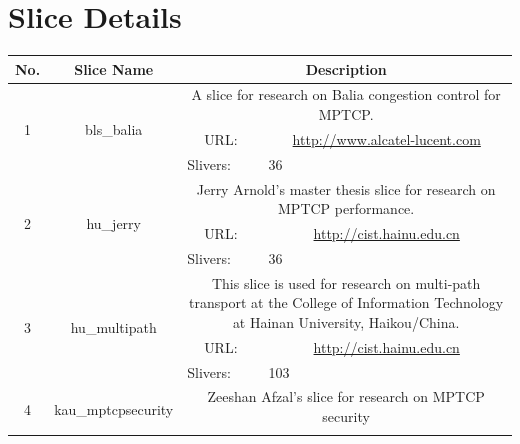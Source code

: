 \chapter{Slice Details}
\label{cha:Slice-Details}


\begin{small}
\begin{center}
\begin{longtable}{|c|c|c|c|}
 \hline
 No. & Slice Name & \multicolumn{2}{|p{20em}|}{Description} \\ \hline
 \multirow{3}{*}{1} & \multirow{3}{*}{\index{bls\_balia}\index{Slice!bls\_balia}bls\_balia} & \multicolumn{2}{|p{30em}|}{A slice for research on Balia congestion control for MPTCP.} \\* \cline{3-3}\cline{4-4}
  &  & \multicolumn{1}{|p{5em}|}{URL:} & \multicolumn{1}{|p{22.5em}|}{\url{http://www.alcatel-lucent.com}} \\* \cline{3-3}\cline{4-4}
  &  & \multicolumn{1}{|l|}{Slivers:} & \multicolumn{1}{|l|}{36} \\ \hline
 \multirow{3}{*}{2} & \multirow{3}{*}{\index{hu\_jerry}\index{Slice!hu\_jerry}hu\_jerry} & \multicolumn{2}{|p{30em}|}{Jerry Arnold's master thesis slice for research on MPTCP performance.} \\* \cline{3-3}\cline{4-4}
  &  & \multicolumn{1}{|p{5em}|}{URL:} & \multicolumn{1}{|p{22.5em}|}{\url{http://cist.hainu.edu.cn}} \\* \cline{3-3}\cline{4-4}
  &  & \multicolumn{1}{|l|}{Slivers:} & \multicolumn{1}{|l|}{36} \\ \hline
 \multirow{3}{*}{3} & \multirow{3}{*}{\index{hu\_multipath}\index{Slice!hu\_multipath}hu\_multipath} & \multicolumn{2}{|p{30em}|}{This slice is used for research on multi-path transport at the College of Information Technology at Hainan University, Haikou/China.} \\* \cline{3-3}\cline{4-4}
  &  & \multicolumn{1}{|p{5em}|}{URL:} & \multicolumn{1}{|p{22.5em}|}{\url{http://cist.hainu.edu.cn}} \\* \cline{3-3}\cline{4-4}
  &  & \multicolumn{1}{|l|}{Slivers:} & \multicolumn{1}{|l|}{103} \\ \hline
 \multirow{3}{*}{4} & \multirow{3}{*}{\index{kau\_mptcpsecurity}\index{Slice!kau\_mptcpsecurity}kau\_mptcpsecurity} & \multicolumn{2}{|p{30em}|}{Zeeshan Afzal's slice for research on MPTCP security} \\* \cline{3-3}\cline{4-4}

\end{longtable}
\end{center}
\end{small}

